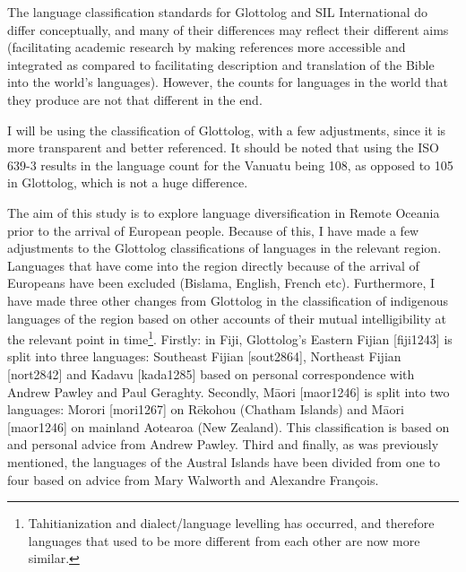 \documentclass[a4paper,10pt]{article} %
\begin{document}
The language classification standards for Glottolog and SIL International do differ conceptually, and many of their differences may reflect their different aims (facilitating academic research by making references more accessible and integrated as compared to facilitating description and translation of the Bible into the world's languages). However, the counts for languages in the world that they produce are not that different in the end.

I will be using the classification of Glottolog, with a few adjustments, since it is more transparent and better referenced. It should be noted that using the ISO 639-3 results in the language count for the Vanuatu being 108, as opposed to 105 in Glottolog, which is not a huge difference. 

The aim of this study is to explore language diversification in Remote Oceania prior to the arrival of European people. Because of this, I have made a few adjustments to the Glottolog classifications of languages in the relevant region. Languages that have come into the region directly because of the arrival of Europeans have been excluded (Bislama, English, French etc). Furthermore, I have made three other changes from Glottolog in the classification of indigenous languages of the region based on other accounts of their mutual intelligibility at the relevant point in time\footnote{Tahitianization and dialect/language levelling has occurred, and therefore languages that used to be more different from each other are now more similar.}. Firstly: in Fiji, Glottolog's Eastern Fijian [fiji1243] is split into three languages: Southeast Fijian [sout2864], Northeast Fijian [nort2842] and Kadavu [kada1285] based on personal correspondence with Andrew Pawley and Paul Geraghty. Secondly, M\={a}ori [maor1246] is split into two languages: Morori [mori1267] on R\={e}kohou (Chatham Islands) and M\={a}ori [maor1246] on mainland Aotearoa (New Zealand). This classification is based on \citet{harlow1973regional} and personal advice from Andrew Pawley. Third and finally, as was previously mentioned, the languages of the Austral Islands have been divided from one to four based on advice from Mary Walworth and Alexandre François.
\end{document}
